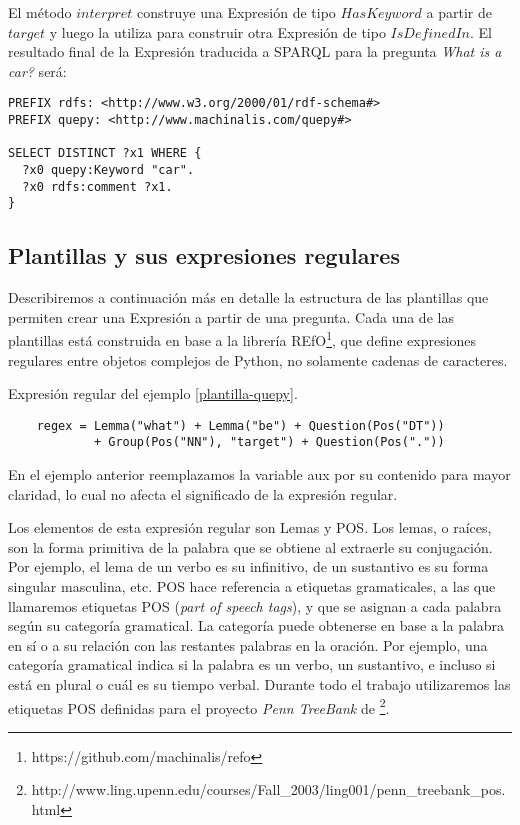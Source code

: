 El método $interpret$ construye una Expresión de tipo $HasKeyword$ a partir de $target$ y luego la utiliza para construir otra Expresión de tipo $IsDefinedIn$. El resultado final de la Expresión traducida a SPARQL para la pregunta \textit{What is a car?} será:

\vspace{5mm}

\begin{lstlisting}
PREFIX rdfs: <http://www.w3.org/2000/01/rdf-schema#>
PREFIX quepy: <http://www.machinalis.com/quepy#>

SELECT DISTINCT ?x1 WHERE {
  ?x0 quepy:Keyword "car".
  ?x0 rdfs:comment ?x1.
}
\end{lstlisting}

\vspace{5mm}

\subsection{Plantillas y sus expresiones regulares}

Describiremos a continuación más en detalle la estructura de las plantillas que permiten crear una Expresión a partir de una pregunta. Cada una de las plantillas está construida en base a la librería REfO\footnote{https://github.com/machinalis/refo}, que define expresiones regulares entre objetos complejos de Python, no solamente cadenas de caracteres.

\begin{example}\label{regex} Expresión regular del ejemplo \ref{plantilla-quepy}.
    \begin{lstlisting}
    regex = Lemma("what") + Lemma("be") + Question(Pos("DT"))
            + Group(Pos("NN"), "target") + Question(Pos("."))
    \end{lstlisting}
\end{example}

En el ejemplo anterior reemplazamos la variable aux por su contenido para mayor claridad, lo cual no afecta el significado de la expresión regular.

Los elementos de esta expresión regular son Lemas y POS. Los lemas, o raíces, son la forma primitiva de la palabra que se obtiene al extraerle su conjugación. Por ejemplo, el lema de un verbo es su infinitivo, de un sustantivo es su forma singular masculina, etc. POS hace referencia a etiquetas gramaticales, a las que llamaremos etiquetas POS (\textit{part of speech tags}), y que se asignan a cada palabra según su categoría gramatical. La categoría puede obtenerse en base a la palabra en sí o a su relación con las restantes palabras en la oración. Por ejemplo, una categoría gramatical indica si la palabra es un verbo, un sustantivo, e incluso si está en plural o cuál es su tiempo verbal. Durante todo el trabajo utilizaremos las etiquetas POS definidas para el proyecto \textit{Penn TreeBank} de \citet{penntreebank}\footnote{http://www.ling.upenn.edu/courses/Fall\_2003/ling001/penn\_treebank\_pos.html}.

